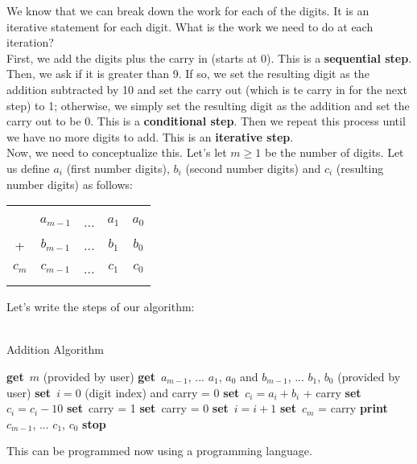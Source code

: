 \documentclass[]{article}
\newcommand{\Get}{\State \textbf{get}~}
\newcommand{\Set}{\State \textbf{set}~}
\newcommand{\Print}{\State \textbf{print}~}
\newcommand{\Stop}{\State \textbf{stop}~}
\begin{document}
\noindent We know that we can break down the work for each of the digits. It is an iterative statement for each digit. What is the work we need to do at each iteration?\\

\noindent First, we add the digits plus the carry in (starts at 0). This is a \textbf{sequential step}. Then, we ask if it is greater than 9. If so, we set the resulting digit as the addition subtracted by 10 and set the carry out (which is te carry in for the next step) to 1; otherwise, we simply set the resulting digit as the addition and set the carry out to be 0. This is a \textbf{conditional step}. Then we repeat this process until we have no more digits to add. This is an \textbf{iterative step}.\\

\noindent Now, we need to conceptualize this. Let's let $m \geq 1$ be the number of digits. Let us define $a_i$ (first number digits), $b_i$ (second number digits) and $c_i$ (resulting number digits) as follows:

\begin{tabular}{ccccc}
	& \tiny & \tiny & \tiny & \tiny \\
	& $a_{m-1}$ & ... & $a_{1}$ & $a_{0}$ \\
	+ & $b_{m-1}$ & ... & $b_{1}$ & $b_{0}$ \\
	\hline
	$c_{m}$ & $c_{m-1}$ & ... & $c_{1}$ & $c_{0}$ \\\smallskip
\end{tabular}

\noindent Let's write the steps of our algorithm:

\begin{algorithm}
	\caption{\\Addition Algorithm}
	\begin{algorithmic}[1]
		\Get $m$ (provided by user)
		\Get $a_{m-1}$, ...  $a_{1}$, $a_{0}$ and $b_{m-1}$, ...  $b_{1}$, $b_{0}$ (provided by user)
		\Set $i = 0$ (digit index) and carry = 0
			\Set $c_i = a_i + b_i$ + carry
				\Set $c_i = c_i - 10$
				\Set carry = 1
			\Else
				\Set carry = 0
			\EndIf
			\Set $i = i + 1$
		\EndWhile
		\Set $c_m$ = carry
		\Print $c_{m-1}$, ...  $c_{1}$, $c_{0}$
		\Stop
	\end{algorithmic}
\end{algorithm}

\noindent This can be programmed now using a programming language.\\
\end{document}
